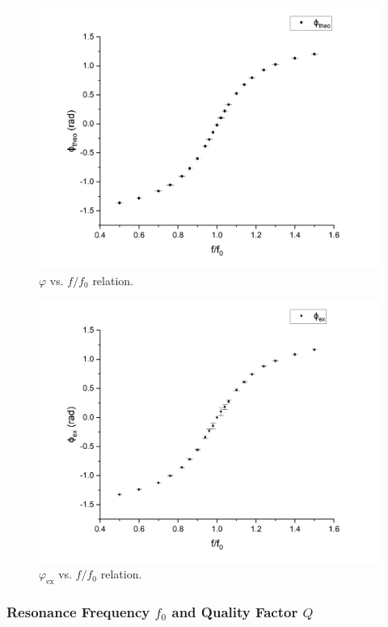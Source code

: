 \documentclass{article}
\begin{document}
\begin{figure}[H]\centering
    \includegraphics[scale=0.37]{phi.png}
    \caption{$\varphi$ vs. $f/f_0$ relation.}\label{FigPhi}
\end{figure}

\begin{figure}[H]\centering
    \includegraphics[scale=0.37]{phi_ex.png}
    \caption{$\varphi_\text{ex}$ vs. $f/f_0$ relation.}\label{FigPhi_ex}
\end{figure}

\subsubsection{Resonance Frequency $f_0$ and Quality Factor $Q$}
\end{document}
